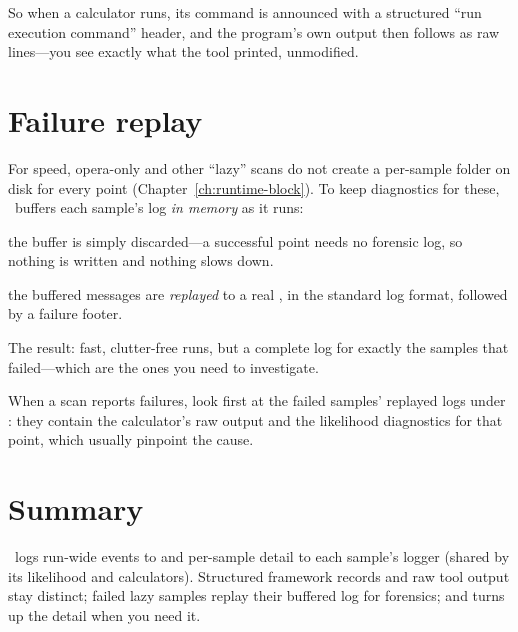 \noindent So when a calculator runs, its command is announced with a structured ``run execution
command'' header, and the program's own output then follows as raw lines---you see exactly what
the tool printed, unmodified.

\section{Failure replay}
\label{sec:log-replay}

For speed, opera-only and other ``lazy'' scans do not create a per-sample folder on disk for every
point (Chapter~\ref{ch:runtime-block}). To keep diagnostics for these, \Jarvis\ buffers each
sample's log \emph{in memory} as it runs:

\begin{description}[style=nextline, leftmargin=1.2em]
  \item[On success] the buffer is simply discarded---a successful point needs no forensic log, so
        nothing is written and nothing slows down.
  \item[On failure] the buffered messages are \emph{replayed} to a real
        , in the standard log format, followed by a failure footer.
\end{description}

\noindent The result: fast, clutter-free runs, but a complete log for exactly the samples that
failed---which are the ones you need to investigate.

\begin{jtip}
When a scan reports failures, look first at the failed samples' replayed logs under
: they contain the calculator's raw output and the likelihood diagnostics for that
point, which usually pinpoint the cause.
\end{jtip}

\section{Summary}
\label{sec:log-summary}

\Jarvis\ logs run-wide events to  and per-sample detail to each sample's logger
(shared by its likelihood and calculators). Structured framework records and raw tool output stay
distinct; failed lazy samples replay their buffered log for forensics; and  turns up
the detail when you need it.
